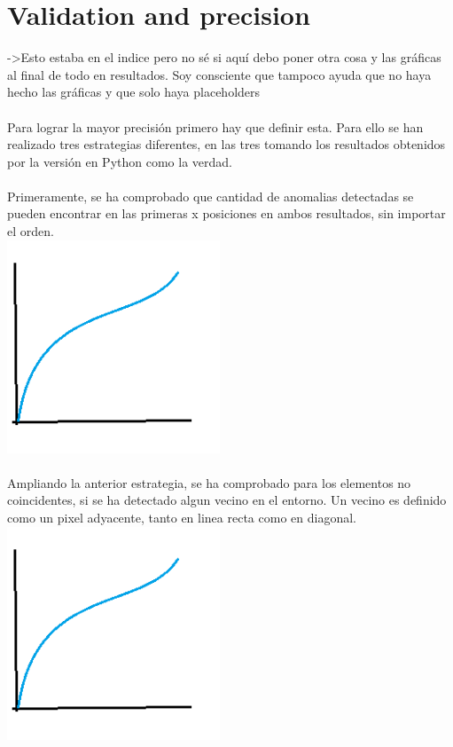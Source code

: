 \section{Validation and precision}
->Esto estaba en el indice pero no sé si aquí debo poner otra cosa y las gráficas al final de todo en resultados. Soy consciente que tampoco ayuda que no haya hecho las gráficas y que solo haya placeholders
\\
\\
Para lograr la mayor precisión primero hay que definir esta.
Para ello se han realizado tres estrategias diferentes, en las tres tomando los resultados obtenidos por la versión en Python como la verdad.
\\
\\
Primeramente, se ha comprobado que cantidad de anomalias detectadas se pueden encontrar en las primeras x posiciones en ambos resultados, sin importar el orden.
\\
\includegraphics[height=2.5in]{figures/precision.png}
\\
\\
Ampliando la anterior estrategia, se ha comprobado para los elementos no coincidentes, si se ha detectado algun vecino en el entorno. Un vecino es definido como un pixel adyacente, tanto en linea recta como en diagonal.
\\
\includegraphics[height=2.5in]{figures/precision.png}
